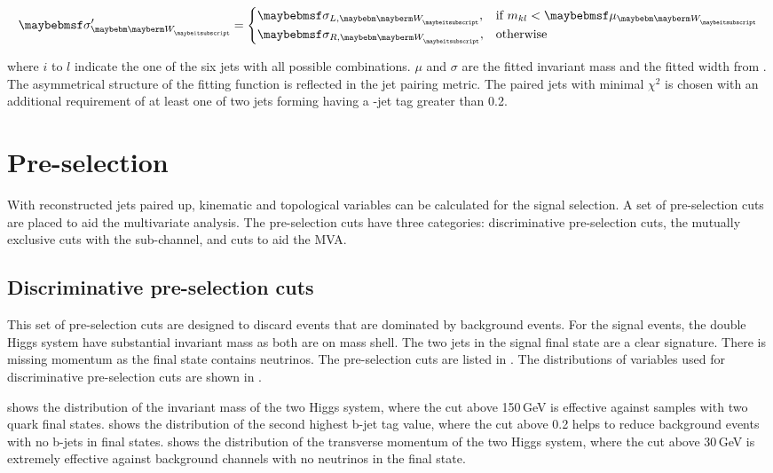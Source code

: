 \begin{equation}
	\sigma_{\PW}^{\prime}=
    \begin{cases}
      \sigma_{L,\PW}, & \text{if}\ m_{kl} < \mu_{\PW}\\
     \sigma_{R,\PW}, & \text{otherwise} \\
   \end{cases}
\end{equation}

where $i$ to $l$ indicate the one of the six jets with all possible combinations. $\mu$ and $\sigma$ are the fitted invariant mass and the fitted width from . The asymmetrical structure of the fitting function is reflected in the jet pairing metric. The paired jets with minimal $\chi^2$ is chosen with an additional requirement of at least one of two jets forming \Hbb having a \Pbottom-jet tag greater than 0.2.


\section{Pre-selection}
\label{sec:doubleHiggsPreSelection}
With reconstructed jets paired up, kinematic and topological variables can be calculated for the signal selection. A set of pre-selection cuts are placed to aid the multivariate analysis. The pre-selection cuts have three categories: discriminative pre-selection cuts, the mutually exclusive cuts with the \eeToHHbbqqqq sub-channel, and cuts to aid the MVA.

\subsection{Discriminative pre-selection cuts}

This set of  pre-selection cuts are designed to discard events that are dominated by background events. For the signal events, the double Higgs system have substantial invariant mass as both \PHiggs are on mass shell. The two \Pbottom jets in the signal final state are a clear signature. There is missing momentum as the final state contains neutrinos. The pre-selection cuts are listed in . The distributions of variables used for discriminative pre-selection cuts are shown in .

 shows the distribution of the invariant mass of the two Higgs system, where the cut above 150\,GeV is effective against samples with two quark final states.  shows the distribution of the second highest b-jet tag value, where the cut above 0.2 helps to reduce background events with no b-jets in final states.  shows the distribution of the transverse momentum  of the two Higgs system, where the cut above 30\,GeV  is extremely effective against background channels with no neutrinos in the final state.

